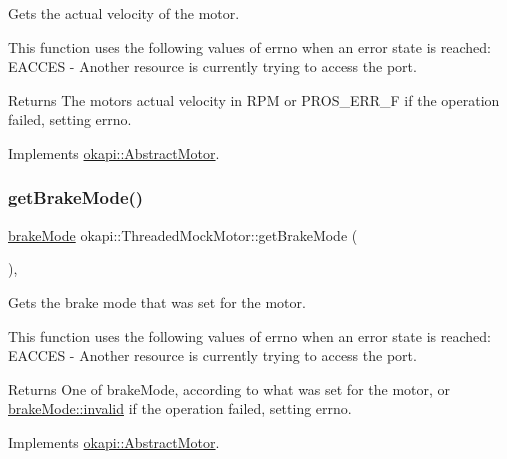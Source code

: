 Gets the actual velocity of the motor. 

This function uses the following values of errno when an error state is reached\+: E\+A\+C\+C\+ES -\/ Another resource is currently trying to access the port.

\begin{DoxyReturn}{Returns}
The motor\textquotesingle{}s actual velocity in R\+PM or P\+R\+O\+S\+\_\+\+E\+R\+R\+\_\+F if the operation failed, setting errno. 
\end{DoxyReturn}


Implements \mbox{\hyperlink{classokapi_1_1AbstractMotor_a45b2013cc318577fad4ac38ad22ce219}{okapi\+::\+Abstract\+Motor}}.

\mbox{\label{classokapi_1_1ThreadedMockMotor_a26629d3a25e6b921996c9350221f0290}} 
\subsubsection{\texorpdfstring{getBrakeMode()}{getBrakeMode()}}
{\footnotesize\ttfamily \mbox{\hyperlink{classokapi_1_1AbstractMotor_a132e0485dbb59a60c3f934338d8fa601}{brake\+Mode}} okapi\+::\+Threaded\+Mock\+Motor\+::get\+Brake\+Mode (\begin{DoxyParamCaption}{ }\end{DoxyParamCaption})\hspace{0.3cm}{\ttfamily [override]}, {\ttfamily [virtual]}}



Gets the brake mode that was set for the motor. 

This function uses the following values of errno when an error state is reached\+: E\+A\+C\+C\+ES -\/ Another resource is currently trying to access the port.

\begin{DoxyReturn}{Returns}
One of brake\+Mode, according to what was set for the motor, or \mbox{\hyperlink{classokapi_1_1AbstractMotor_a132e0485dbb59a60c3f934338d8fa601afedb2d84cafe20862cb4399751a8a7e3}{brake\+Mode\+::invalid}} if the operation failed, setting errno. 
\end{DoxyReturn}


Implements \mbox{\hyperlink{classokapi_1_1AbstractMotor_a157407c39c952a7c2eb497bddb868c93}{okapi\+::\+Abstract\+Motor}}.

